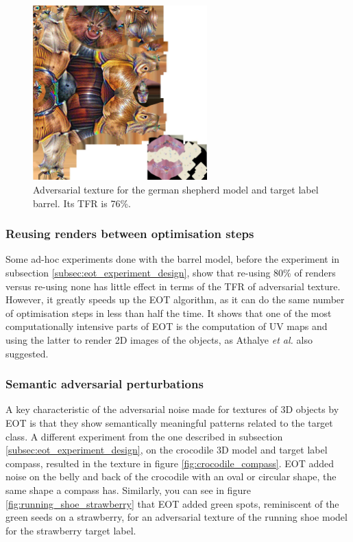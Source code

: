 \begin{figure}[H]
    \centering
    \includegraphics[width=0.6\textwidth]{graphics/german_shepherd_427_adv_9999.jpg}
    \caption[Adversarial texture for the german shepherd model and target label barrel.]{Adversarial texture for the german shepherd model and target label barrel. Its TFR is 76\%.}
    \label{fig:dog_noisy_texture}
\end{figure}

\subsubsection{Reusing renders between optimisation steps}

Some ad-hoc experiments done with the barrel model, before the experiment in subsection \ref{subsec:eot_experiment_design}, show that re-using 80\% of renders versus re-using none has little effect in terms of the TFR of adversarial texture. However, it greatly speeds up the EOT algorithm, as it can do the same number of optimisation steps in less than half the time. It shows that one of the most computationally intensive parts of EOT is the computation of UV maps and using the latter to render 2D images of the objects, as Athalye \textit{et al.} \cite{athalye} also suggested.

\subsubsection{Semantic adversarial perturbations}

A key characteristic of the adversarial noise made for textures of 3D objects by EOT is that they show semantically meaningful patterns related to the target class. A different experiment from the one described in subsection \ref{subsec:eot_experiment_design}, on the crocodile 3D model and target label compass, resulted in the texture in figure \ref{fig:crocodile_compass}. EOT added noise on the belly and back of the crocodile with an oval or circular shape, the same shape a compass has. Similarly, you can see in figure \ref{fig:running_shoe_strawberry} that EOT added green spots, reminiscent of the green seeds on a strawberry, for an adversarial texture of the running shoe model for the strawberry target label.

